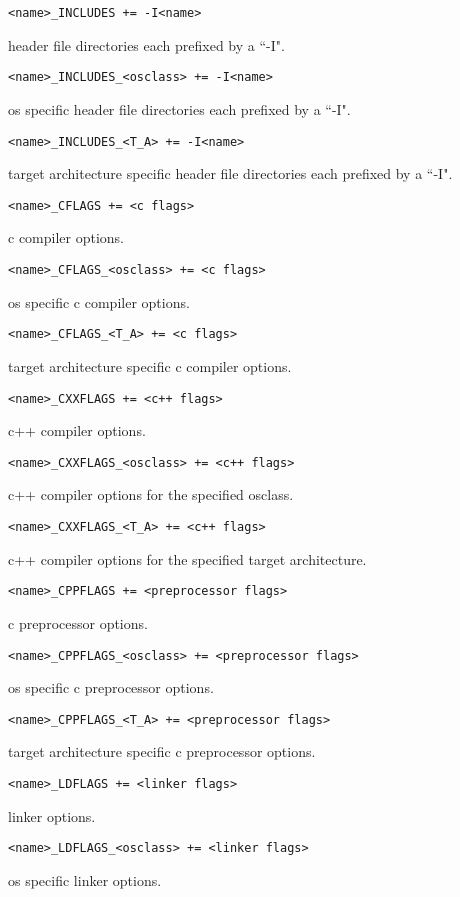 \begin{description}

\item {}\verb|<name>_INCLUDES += -I<name>|

header file directories each prefixed by a ``-I".

\item \verb|<name>_INCLUDES_<osclass> += -I<name>|

os specific header file directories each prefixed by a ``-I".

\item \verb|<name>_INCLUDES_<T_A> += -I<name>|

target architecture specific header file directories each prefixed by a ``-I".

\item {}\verb|<name>_CFLAGS += <c flags>|

c compiler options.

\item \verb|<name>_CFLAGS_<osclass> += <c flags>|

os specific c compiler options.

\item \verb|<name>_CFLAGS_<T_A> += <c flags>|

target architecture specific c compiler options.

\item {}\verb|<name>_CXXFLAGS += <c++ flags>|

c++ compiler options.

\item \verb|<name>_CXXFLAGS_<osclass> += <c++ flags>|

c++ compiler options for the specified osclass.

\item \verb|<name>_CXXFLAGS_<T_A> += <c++ flags>|

c++ compiler options for the specified target architecture.

\item {}\verb|<name>_CPPFLAGS += <preprocessor flags>|

c preprocessor options.

\item \verb|<name>_CPPFLAGS_<osclass> += <preprocessor flags>|

os specific c preprocessor options.

\item \verb|<name>_CPPFLAGS_<T_A> += <preprocessor flags>|

target architecture specific c preprocessor options.

\item {}\verb|<name>_LDFLAGS += <linker flags>|

linker options.

\item \verb|<name>_LDFLAGS_<osclass> += <linker flags>|

os specific linker options.

\end{description}

